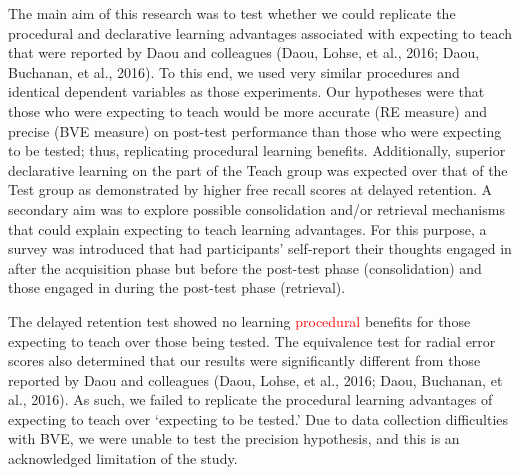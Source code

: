 \documentclass[
  english,
  man,floatsintext]{apa7}
\begin{document}
The main aim of this research was to test whether we could replicate the procedural and declarative learning advantages associated with expecting to teach that were reported by Daou and colleagues (Daou, Lohse, et al., 2016; Daou, Buchanan, et al., 2016). To this end, we used very similar procedures and identical dependent variables as those experiments. Our hypotheses were that those who were expecting to teach would be more accurate (RE measure) and precise (BVE measure) on post-test performance than those who were expecting to be tested; thus, replicating procedural learning benefits. Additionally, superior declarative learning on the part of the Teach group was expected over that of the Test group as demonstrated by higher free recall scores at delayed retention. A secondary aim was to explore possible consolidation and/or retrieval mechanisms that could explain expecting to teach learning advantages. For this purpose, a survey was introduced that had participants' self-report their thoughts engaged in after the acquisition phase but before the post-test phase (consolidation) and those engaged in during the post-test phase (retrieval).

The delayed retention test showed no learning \textcolor{red}{procedural} benefits for those expecting to teach over those being tested. The equivalence test for radial error scores also determined that our results were significantly different from those reported by Daou and colleagues (Daou, Lohse, et al., 2016; Daou, Buchanan, et al., 2016). As such, we failed to replicate the procedural learning advantages of expecting to teach over `expecting to be tested.' Due to data collection difficulties with BVE, we were unable to test the precision hypothesis, and this is an acknowledged limitation of the study.
\end{document}
